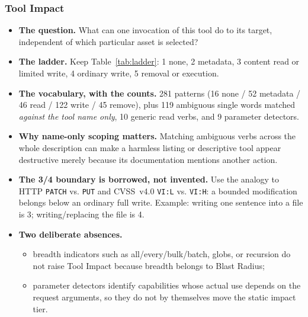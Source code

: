 \subsubsection{Tool Impact}
\label{sec:impact}
\begin{itemize}
  \item \textbf{The question.} What can one invocation of this tool do to its
        target, independent of which particular asset is selected?

  \item \textbf{The ladder.} Keep Table~\ref{tab:ladder}: 1 none, 2 metadata,
        3 content read or limited write, 4 ordinary write, 5 removal or
        execution.

  \item \textbf{The vocabulary, with the counts.} 281 patterns
        (16 none / 52 metadata / 46 read / 122 write / 45 remove), plus 119
        ambiguous single words matched \emph{against the tool name only},
        10 generic read verbs, and 9 parameter detectors.

  \item \textbf{Why name-only scoping matters.} Matching ambiguous verbs across
        the whole description can make a harmless listing or descriptive tool
        appear destructive merely because its documentation mentions another
        action.

  \item \textbf{The 3/4 boundary is borrowed, not invented.} Use the analogy to
        HTTP \texttt{PATCH} vs. \texttt{PUT} and CVSS~v4.0
        \texttt{VI:L} vs. \texttt{VI:H}: a bounded modification belongs below
        an ordinary full write. Example: writing one sentence into a file is 3;
        writing/replacing the file is 4.

  \item \textbf{Two deliberate absences.}
    \begin{itemize}
      \item breadth indicators such as all/every/bulk/batch, globs, or recursion
            do not raise Tool Impact because breadth belongs to Blast Radius;
      \item parameter detectors identify capabilities whose actual use depends
            on the request arguments, so they do not by themselves move the
            static impact tier.
    \end{itemize}


\end{itemize}
